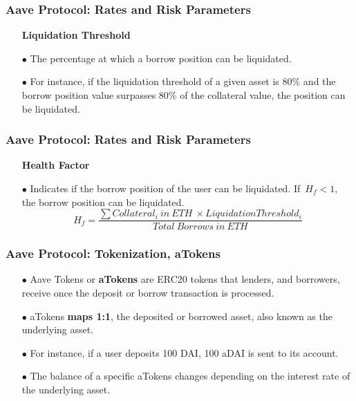 \documentclass{beamer}
\begin{document}
\begin{frame}	
	\frametitle{Aave Protocol: Rates and Risk Parameters}
	\begin{itemize}
		\item[] \textbf{Liquidation Threshold}
		\linebreak
		\item[$\bullet$] The percentage at which a borrow position can be liquidated.
		\item[$\bullet$] For instance, if the liquidation threshold of a given asset is 80\% and the borrow position value surpasses 80\% of the collateral value, the position can be liquidated.
	\end{itemize}
	
\end{frame}

\begin{frame}	
	\frametitle{Aave Protocol: Rates and Risk Parameters}
	\begin{itemize}
		\item[] \textbf{Health Factor}
		\linebreak
		\item[$\bullet$] Indicates if the borrow position of the user can be liquidated.
		If~$H_{f} < 1$, the borrow position can be liquidated.
		\[ H_{f} = \frac{\sum Collateral_{i}~in~ETH~\times Liquidation Threshold_{i}}{Total~Borrows~in~ETH} \]
		
	\end{itemize}
	
\end{frame}

\begin{frame}	
	\frametitle{Aave Protocol: Tokenization, aTokens}
	\begin{itemize}
		\item[$\bullet$] Aave Tokens or \textbf{aTokens} are ERC20 tokens that lenders, and borrowers, receive once the deposit or borrow transaction is processed. 
		\item[$\bullet$] aTokens \textbf{maps 1:1}, the deposited or borrowed asset, also known as the underlying asset. 
		\item[$\bullet$] For instance, if a user deposits 100 DAI, 100 aDAI is sent to its account.
		\item[$\bullet$] The balance of a specific aTokens changes depending on the interest rate of the underlying asset.
		
	\end{itemize}
	
\end{frame}
\end{document}
